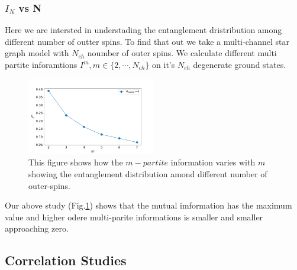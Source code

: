 \documentclass[reprint,prb,superscriptaddress]{revtex4-2}
\begin{document}
\subsubsection{$I_N$ vs N}
\noindent Here we are intersted in understading the entanglement dristribution among different number of outter spins. To find that out we take a multi-channel star graph model with $N_{ch}$ noumber of outer spins. We calculate different multi partite inforamtions $I^m, m\in \{2,\cdots,N_{ch}\}$ on it's $N_{ch}$ degenerate ground states. 

\begin{figure}
\includegraphics[width=0.5\textwidth]{plt/I_N_vs_N_N9.png}
\caption{This figure shows how the $m-partite$ information varies with $m$ showing the entanglement distribution amond different number of outer-spins.}
\label{fig:Im_vs_m}
\end{figure}
\noindent Our above study (Fig.\ref{fig:Im_vs_m}) shows that the mutual imformation has the maximum value and higher odere multi-parite informations is smaller and smaller approaching zero.

\subsection{Correlation Studies}
\end{document}
